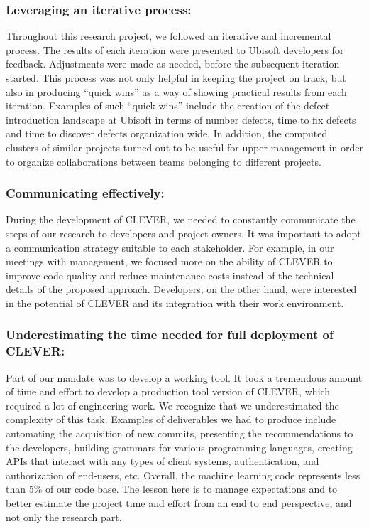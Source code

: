 \documentclass[sigconf]{acmart}
\begin{document}
\subsubsection{Leveraging an iterative
process:}\label{leveraging-an-iterative-process}

Throughout this research project, we followed an iterative and
incremental process. The results of each iteration were presented to
Ubisoft developers for feedback. Adjustments were made as needed, before
the subsequent iteration started. This process was not only helpful in
keeping the project on track, but also in producing ``quick wins'' as a
way of showing practical results from each iteration. Examples of such
``quick wins'' include the creation of the defect introduction landscape
at Ubisoft in terms of number defects, time to fix defects and time to
discover defects organization wide. In addition, the computed clusters
of similar projects turned out to be useful for upper management in
order to organize collaborations between teams belonging to different
projects.

\subsubsection{Communicating
effectively:}\label{communicating-effectively}

During the development of CLEVER, we needed to constantly communicate
the steps of our research to developers and project owners. It was
important to adopt a communication strategy suitable to each
stakeholder. For example, in our meetings with management, we focused
more on the ability of CLEVER to improve code quality and reduce
maintenance costs instead of the technical details of the proposed
approach. Developers, on the other hand, were interested in the
potential of CLEVER and its integration with their work environment.

\subsubsection{Underestimating the time needed for full deployment of
CLEVER:}\label{underestimating-the-time-needed-for-full-deployment-of-clever}

Part of our mandate was to develop a working tool. It took a tremendous
amount of time and effort to develop a production tool version of
CLEVER, which required a lot of engineering work. We recognize that we
underestimated the complexity of this task. Examples of deliverables we
had to produce include automating the acquisition of new commits,
presenting the recommendations to the developers, building grammars for
various programming languages, creating APIs that interact with any
types of client systems, authentication, and authorization of end-users,
etc. Overall, the machine learning code represents less than 5\% of our
code base. The lesson here is to manage expectations and to better
estimate the project time and effort from an end to end perspective, and
not only the research part.
\end{document}
